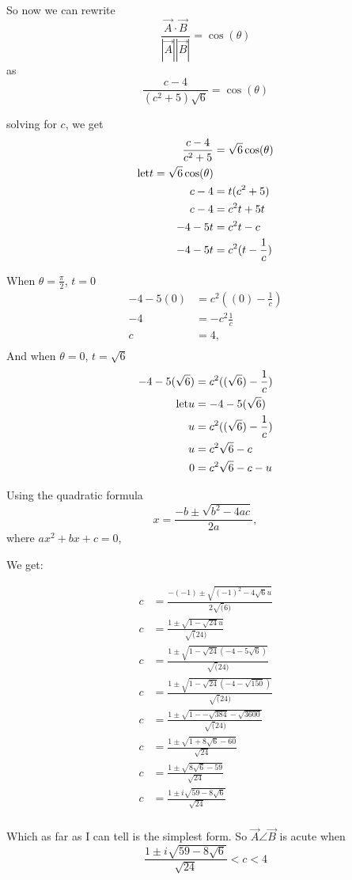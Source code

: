 \documentclass[main.tex]{subfiles}
\begin{document}
So now we can rewrite
\[
\frac{\vec{A}\cdot\vec{B}}{|\vec{A}||\vec{B}|} = \cos(\theta)
\]
as
\[
\frac{c-4}{(c^2 + 5)  \sqrt{6}} = \cos(\theta)
\]

solving for $c$, we get
\begin{align*}
\frac{c-4}{c^2 + 5} &= \sqrt{6} \cos(\theta)\\
\text{let}\space t = \sqrt{6} \cos(\theta)\\
c-4 &= t (c^2 + 5)\\
c-4 &=  c^2t + 5 t\\
-4 - 5 t &=  c^2t  - c\\
-4 - 5 t &=  c^2(t  - \frac{1}{c})\\
\end{align*}

When $\theta = \frac{\pi}{2}$, $t = 0$
\begin{align*}
-4 - 5 (0) &=  c^2((0)  - \frac{1}{c})\\
-4 &=   - c^2 \frac{1}{c}\\
c &= 4,\\
\end{align*}
And when $\theta = 0$, $t = \sqrt{6}$
\begin{align*}
-4 - 5 (\sqrt{6}) &=  c^2((\sqrt{6})  - \frac{1}{c})\\
\text{let}\space u &= -4 - 5 (\sqrt{6})\\
u &=  c^2((\sqrt{6})  - \frac{1}{c})\\
u &=  c^2\sqrt{6}  - c\\
0 &=  c^2\sqrt{6}  - c - u\\
\end{align*}

Using the quadratic formula \[x = \frac{-b \pm \sqrt{b^2 - 4ac}}{2a},\]
 where $ax^2 + bx + c =0$,

We get:

\begin{align*}
c &= \frac{-(-1) \pm \sqrt{(-1)^2 - 4\sqrt{6}u}}{2\sqrt(6)}\\
c &= \frac{1 \pm \sqrt{1 - \sqrt{24}u}}{\sqrt(24)}\\
c &= \frac{1 \pm \sqrt{1 - \sqrt{24}(-4-5\sqrt{6})}}{\sqrt(24)}\\
c &= \frac{1 \pm \sqrt{1 - \sqrt{24}(-4-\sqrt{150})}}{\sqrt(24)}\\
c &= \frac{1 \pm \sqrt{1 - -\sqrt{384}-\sqrt{3600}}}{\sqrt(24)}\\
c &= \frac{1 \pm \sqrt{1 + 8\sqrt{6}-60}}{\sqrt{24}}\\
c &= \frac{1 \pm \sqrt{ 8\sqrt{6}-59}}{\sqrt{24}}\\
c &= \frac{1 \pm i\sqrt{ 59- 8\sqrt{6}}}{\sqrt{24}}\\
\end{align*}

Which as far as I can tell is the simplest form.
So $\vec{A}\angle\vec{B}$ is acute when \[
\frac{1 \pm i\sqrt{ 59- 8\sqrt{6}}}{\sqrt{24}} < c < 4\]
\end{document}
